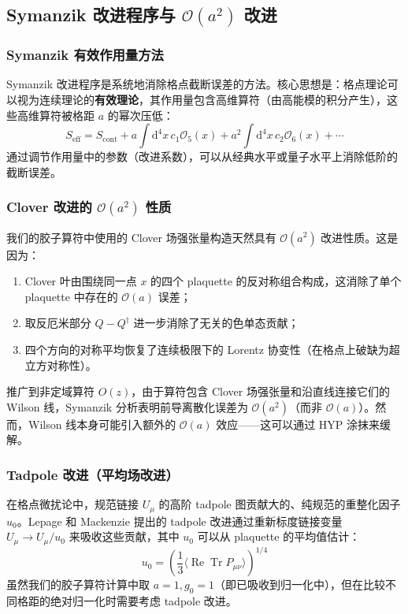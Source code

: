 \documentclass[11pt,a4paper]{ctexart}
\newcommand{\order}[1]{\mathcal{O}(#1)}
\begin{document}
\subsection{Symanzik 改进程序与 $\order{a^2}$ 改进}

\subsubsection{Symanzik 有效作用量方法}

Symanzik 改进程序是系统地消除格点截断误差的方法。核心思想是：格点理论可以视为连续理论的\textbf{有效理论}，其作用量包含高维算符（由高能模的积分产生），这些高维算符被格距 $a$ 的幂次压低：
\begin{equation}
S_{\text{eff}} = S_{\text{cont}} + a \int \mathrm{d}^4 x \, c_1 \mathcal{O}_5(x) + a^2 \int \mathrm{d}^4 x \, c_2 \mathcal{O}_6(x) + \cdots
\end{equation}
通过调节作用量中的参数（改进系数），可以从经典水平或量子水平上消除低阶的截断误差。

\subsubsection{Clover 改进的 $\order{a^2}$ 性质}

我们的胶子算符中使用的 Clover 场强张量构造天然具有 $\order{a^2}$ 改进性质。这是因为：
\begin{enumerate}
  \item Clover 叶由围绕同一点 $x$ 的四个 plaquette 的反对称组合构成，这消除了单个 plaquette 中存在的 $\order{a}$ 误差；
  \item 取反厄米部分 $Q - Q^\dagger$ 进一步消除了无关的色单态贡献；
  \item 四个方向的对称平均恢复了连续极限下的 Lorentz 协变性（在格点上破缺为超立方对称性）。
\end{enumerate}

推广到非定域算符 $O(z)$，由于算符包含 Clover 场强张量和沿直线连接它们的 Wilson 线，Symanzik 分析表明前导离散化误差为 $\order{a^2}$（而非 $\order{a}$）。然而，Wilson 线本身可能引入额外的 $\order{a}$ 效应——这可以通过 HYP 涂抹来缓解。

\subsubsection{Tadpole 改进（平均场改进）}

在格点微扰论中，规范链接 $U_\mu$ 的高阶 tadpole 图贡献大的、纯规范的重整化因子 $u_0$。Lepage 和 Mackenzie 提出的 tadpole 改进通过重新标度链接变量 $U_\mu \to U_\mu/u_0$ 来吸收这些贡献，其中 $u_0$ 可以从 plaquette 的平均值估计：
\begin{equation}
u_0 = \left( \frac{1}{3} \langle \operatorname{Re} \operatorname{Tr} P_{\mu\nu} \rangle \right)^{1/4}
\end{equation}
虽然我们的胶子算符计算中取 $a=1, g_0=1$（即已吸收到归一化中），但在比较不同格距的绝对归一化时需要考虑 tadpole 改进。
\end{document}
